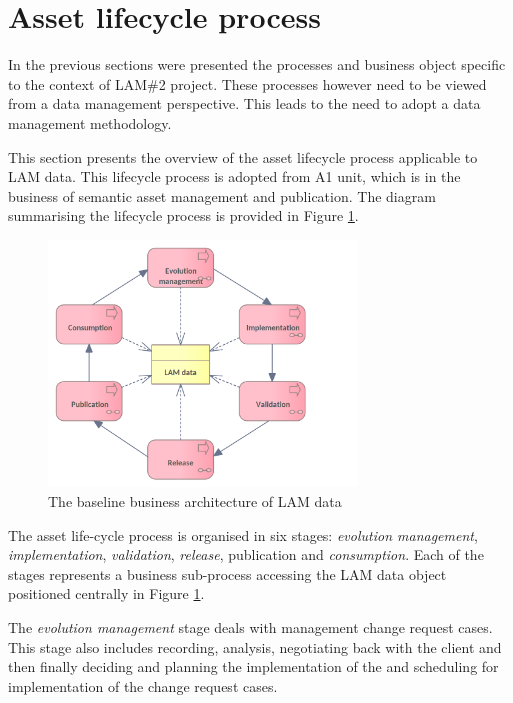 	\section{Asset lifecycle process}
	\label{sec:asset-lifecycle}
	
	In the previous sections were presented the processes and business object specific to the context of LAM\#2 project. These processes however need to be viewed from a data management perspective. This leads to the need to adopt a data management methodology. 
	
	This section presents the overview of the asset lifecycle process applicable to LAM data. This lifecycle process is adopted from A1 unit, which is in the business of semantic asset management and publication. The diagram summarising the lifecycle process is provided in Figure \ref{fig:lifecycle-overview}. 
	
	\begin{figure}[!h]
		\centering
		\includegraphics[width=0.73\textwidth]{images/business/lifecycle/Lyfecycle overview.png}
		\caption{The baseline business architecture of LAM data}
		\label{fig:lifecycle-overview}
	\end{figure} 

	The asset life-cycle process is organised in six stages: \textit{evolution management}, \textit{implementation}, \textit{validation}, \textit{release}, publication and \textit{consumption}. Each of the stages represents a business sub-process accessing the LAM data object positioned centrally in Figure \ref{fig:lifecycle-overview}.
	
	The \textit{evolution management} stage deals with management change request cases. This stage also includes recording, analysis, negotiating back with the client and
then finally deciding and planning the implementation of the and scheduling for implementation of the change request cases.
	
